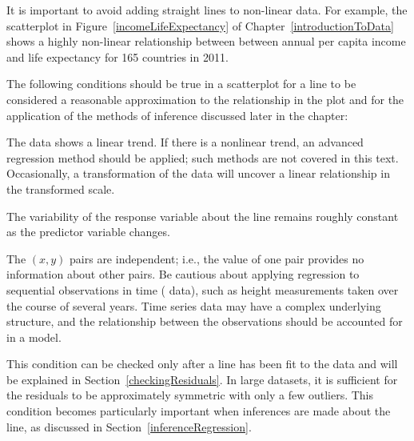 It is important to avoid adding straight lines to non-linear data. For example, the scatterplot in Figure~\ref{incomeLifeExpectancy} of Chapter~\ref{introductionToData} shows a highly non-linear relationship between between annual per capita income and life expectancy for 165 countries in 2011.

The following conditions should be true in a scatterplot for a line to be considered a reasonable approximation to the relationship in the plot and for the application of the methods of inference discussed later in the chapter:




\begin{description}
\setlength{\itemsep}{0mm}
\item[1 Linearity.] The data shows a linear trend. If there is a nonlinear trend, an advanced regression method should be applied; such methods are not covered in this text.  Occasionally, a transformation of the data will uncover a linear relationship in the transformed scale.
\item[2 Constant variability.] The variability of the response variable about the line remains roughly constant as the predictor variable changes.
\item[3 Independent observations.]  The $(x,y)$ pairs are independent; i.e., the value of one pair provides no information about other pairs. Be cautious about applying regression to sequential observations in time ( data), such as height measurements taken over the course of several years. Time series data may have a complex underlying structure, and the relationship between the observations should be accounted for in a model. 
\item[4 Residuals that are approximately normally distributed.] This condition can be checked only after a line has been fit to the data and will be explained in Section~\ref{checkingResiduals}. In large datasets, it is sufficient for the residuals to be approximately symmetric with only a few outliers. This condition becomes particularly important when inferences are made about the line, as discussed in Section~\ref{inferenceRegression}.  
\end{description}

